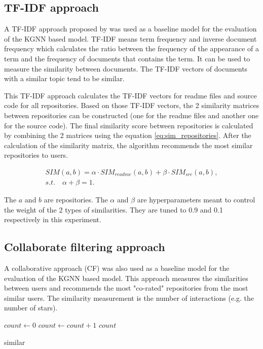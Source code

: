 \documentclass[11pt,twoside]{report}
\begin{document}
\subsection{TF-IDF approach}
A TF-IDF approach proposed by \cite{xu_repersp_2017,sun_personalized_2018} was used as a baseline model for the evaluation of the KGNN based model. TF-IDF means term frequency and inverse document frequency which calculates the ratio between the frequency of the appearance of a term and the frequency of documents that contains the term. It can be used to measure the similarity between documents. The TF-IDF vectors of documents with a similar topic tend to be similar.

This TF-IDF approach calculates the TF-IDF vectors for readme files and source code for all repositories. Based on those TF-IDF vectors, the 2 similarity matrices between repositories can be constructed (one for the readme files and another one for the source code). The final similarity score between repositories is calculated by combining the 2 matrices using the equation \ref{eq:sim_repositories}. After the calculation of the similarity matrix, the algorithm recommends the most similar repositories to users.

\begin{gather}
    SIM(a,b)=\alpha\cdot{SIM_{readme}(a,b)}+\beta\cdot{SIM_{src}(a,b)}, \\
    s.t.\quad\alpha+\beta=1.
    \label{eq:sim_repositories}
\end{gather}

The $a$ and $b$ are repositories. The $\alpha$ and $\beta$ are hyperparameters meant to control the weight of the 2 types of similarities. They are tuned to 0.9 and 0.1 respectively in this experiment.

\subsection{Collaborate filtering approach}
A collaborative approach \cite{guendouz_recommending_2015} (CF) was also used as a baseline model for the evaluation of the KGNN based model. This approach measures the similarities between users and recommends the most "co-rated" repositories from the most similar users. The similarity measurement is the number of interactions (e.g. the number of stars).

\begin{algorithm}[H]
    \DontPrintSemicolon
    

    $count \leftarrow 0$ \newline
    {
        {
            $count \leftarrow count + 1$
        }
    }
    \Return $count$
    
    \caption{similar}
    \label{alg:similar}
\end{algorithm}
\end{document}
